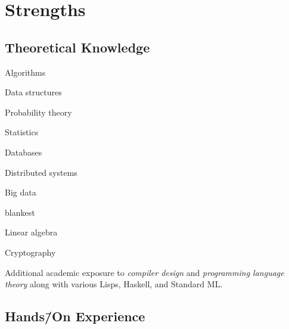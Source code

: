 \documentclass[%
version=last,%
fontsize=11pt,%
paper=A4,%
areasetadvanced,%
headinclude=false,%
footinclude=false,%
headlines=0,%
footlines=0,%
toc=bibnumbered,%
]{scrartcl}
\begin{document}
\begin{minipage}[t]{.4\textwidth}
  \vspace*{0cm}%
  \section{Strengths}%
  \label{sec:strengths}

  \subsection{Theoretical Knowledge}%
  \label{sec:theoretical-knowledge}

  \begin{UniformTCBRaster}{2}
    \begin{TCBUnlabeledItems}
    \item Algorithms
    \item Data structures
    \end{TCBUnlabeledItems}
    \begin{TCBUnlabeledItems}
    \item Probability theory
    \item Statistics
    \end{TCBUnlabeledItems}
    \begin{TCBUnlabeledItems}
    \item Databases
    \item Distributed systems
    \item Big data
    \end{TCBUnlabeledItems}
    \begin{tcboxedraster}[raster columns=1]{blankest}
      \begin{tcolorbox}
        Linear algebra
      \end{tcolorbox}
      \begin{tcolorbox}
        Cryptography
      \end{tcolorbox}
    \end{tcboxedraster}
  \end{UniformTCBRaster}
  \begingroup%
  \small%
  Additional academic exposure to \emph{compiler design} and \emph{programming
    language theory} along with various Lisps, Haskell, and Standard ML\@.\par%
  \endgroup%

  \subsection{\texorpdfstring{Hands\=/On Experience}{Hands-On Experience}}%
  \label{sec:hands-on-experience}


\end{minipage}
\end{document}
